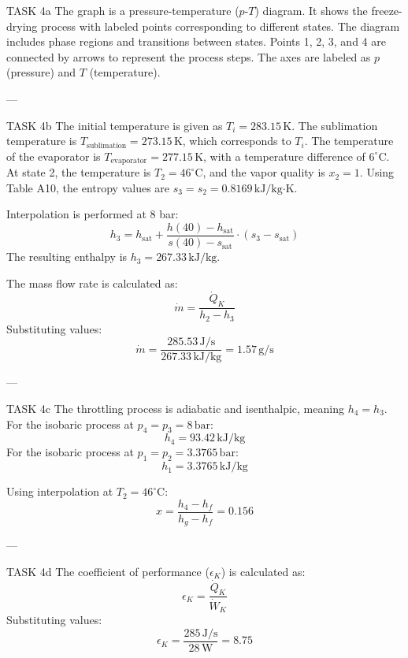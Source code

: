 TASK 4a  
The graph is a pressure-temperature (\( p \)-\( T \)) diagram. It shows the freeze-drying process with labeled points corresponding to different states. The diagram includes phase regions and transitions between states. Points 1, 2, 3, and 4 are connected by arrows to represent the process steps. The axes are labeled as \( p \) (pressure) and \( T \) (temperature).

---

TASK 4b  
The initial temperature is given as \( T_i = 283.15 \, \text{K} \). The sublimation temperature is \( T_{\text{sublimation}} = 273.15 \, \text{K} \), which corresponds to \( T_i \).  
The temperature of the evaporator is \( T_{\text{evaporator}} = 277.15 \, \text{K} \), with a temperature difference of \( 6^\circ \text{C} \).  
At state 2, the temperature is \( T_2 = 46^\circ \text{C} \), and the vapor quality is \( x_2 = 1 \).  
Using Table A10, the entropy values are \( s_3 = s_2 = 0.8169 \, \text{kJ/kg·K} \).  

Interpolation is performed at 8 bar:  
\[
h_3 = h_{\text{sat}} + \frac{h(40) - h_{\text{sat}}}{s(40) - s_{\text{sat}}} \cdot (s_3 - s_{\text{sat}})
\]  
The resulting enthalpy is \( h_3 = 267.33 \, \text{kJ/kg} \).  

The mass flow rate is calculated as:  
\[
\dot{m} = \frac{\dot{Q}_K}{h_2 - h_3}
\]  
Substituting values:  
\[
\dot{m} = \frac{285.53 \, \text{J/s}}{267.33 \, \text{kJ/kg}} = 1.57 \, \text{g/s}
\]

---

TASK 4c  
The throttling process is adiabatic and isenthalpic, meaning \( h_4 = h_3 \).  
For the isobaric process at \( p_4 = p_3 = 8 \, \text{bar} \):  
\[
h_4 = 93.42 \, \text{kJ/kg}
\]  
For the isobaric process at \( p_1 = p_2 = 3.3765 \, \text{bar} \):  
\[
h_1 = 3.3765 \, \text{kJ/kg}
\]  

Using interpolation at \( T_2 = 46^\circ \text{C} \):  
\[
x = \frac{h_4 - h_f}{h_g - h_f} = 0.156
\]

---

TASK 4d  
The coefficient of performance (\( \epsilon_K \)) is calculated as:  
\[
\epsilon_K = \frac{\dot{Q}_K}{\dot{W}_K}
\]  
Substituting values:  
\[
\epsilon_K = \frac{285 \, \text{J/s}}{28 \, \text{W}} = 8.75
\]